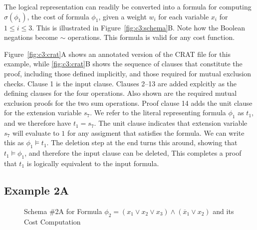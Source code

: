 \documentclass{llncs}
\newcommand{\tautology}{1}
\newcommand{\obar}[1]{\overline{#1}}
\newcommand{\oneminus}{{\sim}}
\newcommand{\turnstile}{\models}
\newcommand{\cost}{\sigma}
\begin{document}
The logical representation can readily be converted into a formula for
computing $\cost(\phi_1)$, the cost of formula $\phi_1$, given a weight
$w_i$ for each variable $x_i$ for $1 \leq i \leq 3$.  This is
illustrated in Figure~\ref{fig:c3:schema}B\@.  Note how the Boolean
negations become $\oneminus$ operations.  This formula is valid for
any cost function.

Figure~\ref{fig:c3:crat}A shows an annotated version of the CRAT file
for this example, while \ref{fig:c3:crat}B shows the sequence of clauses that constitute the proof, including those defined implicitly, and those required for mutual exclusion checks.
   Clause 1
is the input clause.
Clauses 2--13 are added explcitly as the defining clauses for the four operations.
Also shown are the required mutual exclusion proofs for the two sum operations.
Proof clause 14 adds the unit clause for the extension variable $s_7$.
We refer to the literal representing formula $\phi_1$ as $t_1$,
and we therefore have $t_1 = s_7$.
The unit clause indicates that extension variable $s_7$ will evaluate to
$\tautology$  for any assigment that satisfies the formula.  We
can write this as $\phi_1 \turnstile t_1$.  The
deletion step at the end turns this around, showing that
$t_1 \turnstile \phi_1$,
and therefore the input clause can be deleted, This
completes a proof that $t_1$ is logically
equivalent to the input formula.

\subsection{Example 2A}

\begin{figure}
  \caption{Schema \#2A for Formula $\phi_2 = (x_1 \lor x_2 \lor x_3) \land (\obar{x}_1 \lor x_2)$ and its Cost Computation}
\label{fig:p2-bdd:schema}
\end{figure}
\end{document}
